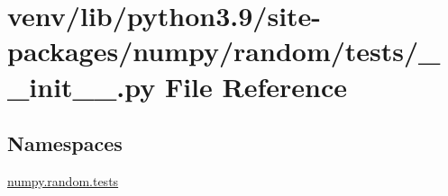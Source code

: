\hypertarget{venv_2lib_2python3_89_2site-packages_2numpy_2random_2tests_2____init_____8py}{}\section{venv/lib/python3.9/site-\/packages/numpy/random/tests/\+\_\+\+\_\+init\+\_\+\+\_\+.py File Reference}
\label{venv_2lib_2python3_89_2site-packages_2numpy_2random_2tests_2____init_____8py}
\subsection*{Namespaces}
\begin{DoxyCompactItemize}
\item 
 \hyperlink{namespacenumpy_1_1random_1_1tests}{numpy.\+random.\+tests}
\end{DoxyCompactItemize}
